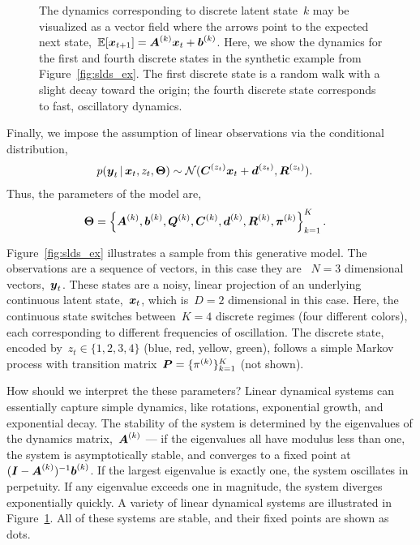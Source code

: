 \documentclass{article}
\begin{document}
\begin{figure}[t]
\begin{subfigure}{.24\textwidth}
\end{subfigure} 
\caption{The dynamics corresponding to discrete latent state~$k$ may
  be visualized as a vector field where the arrows point to the
  expected next state,~$\mathbb{E}[\boldsymbol{x}_{t+1}]=\boldsymbol{A}^{(k)}\boldsymbol{x}_t + \boldsymbol{b}^{(k)}$.
Here, we show the dynamics for the first and fourth discrete states 
in the synthetic example from Figure~\ref{fig:slds_ex}. The first 
discrete state is a random walk with a slight decay toward the origin;
the fourth discrete state corresponds to fast, oscillatory dynamics.}
\label{fig:slds_dynamics_ex}
\end{figure}


Finally, we impose the assumption of linear observations via the conditional
distribution,
\begin{align}
  p(\boldsymbol{y}_t \,|\, \boldsymbol{x}_{t}, z_{t}, \boldsymbol{\Theta}) 
  &\sim \mathcal{N}(\boldsymbol{C}^{(z_{t})} \boldsymbol{x}_{t} + \boldsymbol{d}^{(z_{t})}, \boldsymbol{R}^{(z_t)}).
\end{align}
Thus, the parameters of the model are,
\begin{align}
  \boldsymbol{\Theta} &= \left\{ \boldsymbol{A}^{(k)}, \boldsymbol{b}^{(k)}, \boldsymbol{Q}^{(k)}, \boldsymbol{C}^{(k)}, \boldsymbol{d}^{(k)}, \boldsymbol{R}^{(k)}, \boldsymbol{\pi}^{(k)} \right\}_{k=1}^K .
\end{align}

Figure~\ref{fig:slds_ex} illustrates a sample from this generative model.
The observations are a sequence of vectors, in this case they are ~$N=3$ dimensional
vectors,~$\boldsymbol{y}_t$.  These states are a noisy, linear projection of an underlying
continuous latent state,~$\boldsymbol{x}_t$, which is~$D=2$ dimensional in this case.
Here, the continuous state switches between~$K=4$ discrete regimes (four
different colors), each corresponding to different frequencies of oscillation.
The discrete state, encoded by~$z_t \in \{1, 2, 3, 4\}$ (blue, red, yellow, green),
follows a simple Markov process with transition matrix~${\boldsymbol{P} = \{\pi^{(k)}\}_{k=1}^K}$
(not shown).

How should we interpret the these parameters? Linear dynamical
systems can essentially capture simple dynamics, like rotations, exponential
growth, and exponential decay. The stability of the system is determined
by the eigenvalues of the dynamics matrix,~$\boldsymbol{A}^{(k)}$ --- if the eigenvalues
all have modulus less than one, the system is asymptotically stable, and
converges to a fixed point at~$(\boldsymbol{I} - \boldsymbol{A}^{(k)})^{-1} \boldsymbol{b}^{(k)}$. If
the largest eigenvalue is exactly one, the system oscillates in perpetuity.
If any eigenvalue exceeds one in magnitude, the system diverges exponentially
quickly.  A variety of linear dynamical systems are illustrated in
Figure~\ref{fig:slds_dynamics_ex}. All of these systems are stable, and their
fixed points are shown as dots.
\end{document}
